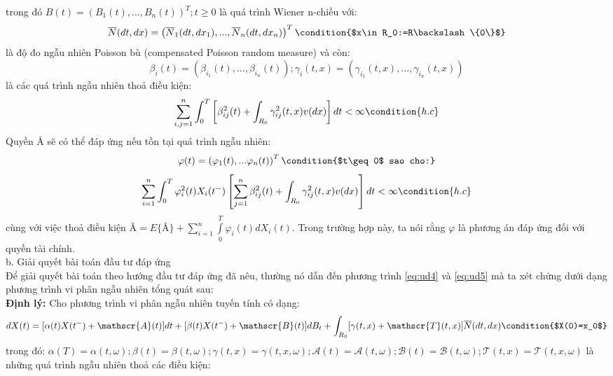 \documentclass[12pt,a4paper]{article}
\begin{document}
trong đó $B(t)=(B_1(t),...,B_n(t))^T;t\geq 0$ là quá trình Wiener n-chiều với:
\begin{equation*}
	\overline{N}(dt,dx)=\left(\overline{N}_1(dt,dx_1),...,\overline{N}_n(dt,dx_n)\right)^T \condition{$x\in R_0:=R\backslash\{0\}$}
\end{equation*}
là độ đo ngẫu nhiên Poisson bù (compensated Poisson random measure) và còn:
\begin{equation*}
	\beta_i(t)=(\beta_{i_1}(t),...,\beta_{i_n}(t));\gamma_i(t,x)=(\gamma_{i_1}(t,x),...,\gamma_{i_n}(t,x))
\end{equation*}
là các quá trình ngẫu nhiên thoả điều kiện:
\begin{equation*}
	\sum_{i,j=1}^{n}\int_{0}^{T}\left[\beta_{ij}^2(t)+\int_{R_0}\gamma_{ij}^2(t,x)v(dx) \right]dt<\infty \condition{h.c}
\end{equation*}
Quyền $\text{\AA}$ sẽ có thể đáp ứng nếu tồn tại quá trình ngẫu nhiên:
\begin{equation*}
	\varphi(t)=\left(\varphi_1(t),...\varphi_n(t) \right)^T \condition{$t\geq 0$ sao cho:}\\
\end{equation*}
\begin{equation*}
	\sum_{i=1}^{n}\int_{0}^{T}\varphi_i^2(t)X_i(t^-)\left[\sum_{j=1}^{n}\beta_{ij}^2(t)+\int_{R_0}\gamma_{ij}^2(t,x)v(dx) \right]dt<\infty \condition{h.c}
\end{equation*}
cùng với việc thoả điều kiện $\text{\AA}=E\{\text{\AA}\}+\sum\limits_{i=1}^{n}\int\limits_{0}^{T}\varphi_i(t)dX_i(t)$. Trong trường hợp này, ta nói rằng $\varphi$ là phương án đáp ứng đối với quyền tài chính.\\
b. Giải quyết bài toán đầu tư đáp ứng\\
Để giải quyết bài toán theo hướng đầu tư đáp ứng đã nêu, thường nó dẫn đến phương trình \eqref{eq:ud4} và \eqref{eq:ud5} mà ta xét chứng dưới dạng phương trình vi phân ngẫu nhiên tổng quát sau:\\
\textbf{Định lý:} Cho phương trình vi phân ngẫu nhiên tuyến tính có dạng:
\begin{dmath*}
dX(t)=[\alpha(t)X(t^-)+\mathscr{A}(t)]dt+[\beta(t)X(t^-)+\mathscr{B}(t)]dB_t\\ +\int_{R_0}[\gamma(t,x)+\mathscr{T}(t,x)]\overline{N}(dt,dx) \condition{$X(0)=x_0$}
\end{dmath*}
trong đó: $\alpha(T)=\alpha(t,\omega);\beta(t)=\beta(t,\omega);\gamma(t,x)=\gamma(t,x,\omega);\mathscr{A}(t)=\mathscr{A}(t,\omega);\mathscr{B}(t)=\mathscr{B}(t,\omega);\mathscr{T}(t,x)=\mathscr{T}(t,x,\omega)$ là những quá trình ngẫu nhiên thoả các điều kiện:
\end{document}
